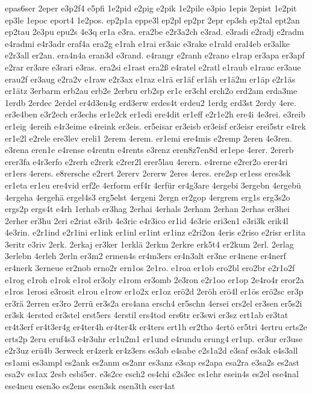 {epas6ser
2eper
e3p2f4
e5pfi
1e2pid
e2pig
e2pik
1e2pile
e3pio
1epis
2epist
1e2pit
ep3le
1epoc
eport4
1e2pos.
ep2p1a
eppe3l
ep2pl
ep2pr
2epr
ep3sh
ep2tal
ept2an
ep2tau
2e3pu
epu2s
4e3q
er1a
e3ra.
era2be
e2r3a2ch
e3rad.
e3radi
e2radj
e2radm
e4radmi
e4r3adr
eraf4a
era2g
e1rah
e1rai
er3aic
e3rake
e1rald
eral4eb
er3alke
e2r3all
er2an.
era4n4a
eran3d
e3rand.
e4rangr
e2ranh
e2rano
e1rap
er3apa
er3apf
e2rar
er3are
e3rari
e3ras.
era2si
e1rast
era2ß
e4ratel
e2ratl
e1raub
e1rauc
er3aue
erau2f
er3aug
e2ra2v
e1raw
e2r3ax
e1raz
e1rä
er1äf
er1äh
er1ä2m
er1äp
e2r1äs
er1ätz
3erbarm
erb2au
erb2e
2erbru
erb2sp
er1c
er3chl
erch2o
erd2am
erda3me
1erdb
2erdec
2erdel
er4d3en4g
erd3erw
erdes4t
erdeu2
1erdg
erd3st
2erdy
4ere.
er3e4ben
e3r2ech
er3echs
er1e2ck
er1edi
ere4dit
er1eff
e2r1e2h
ere4i
4e3rei.
e3reib
er1eig
4ereih
e4r3eime
e4reink
er3eis.
er5eisar
er3eisb
er3eisf
er3eisr
erei5str
e4rek
er1e2l
e2rele
ere3lev
ereli1
2erem
4erem.
er1emi
ere4mis
e2remp
2eren
4e3ren.
e3rena
eren1e
e4rense
e4rentn
e4rents
e3renz
eren8z7en8d
er1epe
4erer.
2ererb
erer3fa
e4r3erfo
e2rerh
e2rerk
e2rer2l
erer5lau
4erern.
e4rerne
e2rer2o
erer4ri
er1ers
4erers.
e8rersche
e2rert
2ererv
2ererw
2eres
4eres.
ere2sp
er1ess
eres3sk
er1eta
er1eu
ere4vid
erf2e
4erform
erf4r
4erfür
er4g3are
4ergebi
3ergebn
4ergebü
4ergeha
4ergehä
ergel4s3
erg5elst
4ergeni
2ergn
er2gop
4ergrem
erg1s
erg3s2o
ergs2p
ergs4t
e4rh
1erhab
er3hag
2erhai
4erhals
2erham
2erhan
2erhas
er3hei
2erher
er3hu
2eri
e2riat
e3rib
4e3ric
e4r3ico
er1id
4e3rie
eri3en1
e3ri3k
erik4l
4e3rin.
e2r1ind
e2r1ini
er1ink
er1inl
er1int
er1inz
e2ri2on
4eris
e2riso
e2risr
er1ita
3eritr
e3riv
2erk.
2erkaj
er3ker
1erklä
2erkm
2erkre
erk5t4
er2kum
2erl.
2erlag
3erlebn
4erleh
2erln
er3m2
ermen4s
er4m3ers
er4n3alt
er3ne
er4nene
er4nerf
er4nerk
3erneue
er2nob
erno2r
ern1os
2e1ro.
e1roa
er1ob
ero2bl
ero2br
e2r1o2f
e1rog
e1roh
e1rok
e1rol
er3oly
e1rom
er3omb
2e3ron
e2r1oo
er1op
2e4ro4r
eror2a
e1ros
1erosi
e3rosit
e1rou
e1row
er1o2x
er1oz
erö2d
2eröh
erö4l
er1ös
erö2sc
er3p
er3rä
2erren
er3ro
2errü
er3s2a
ers4ana
ersch4
er5schn
4ersei
ers2el
er3sen
er5s2i
er3sk
4ersted
er3stel
erst5ers
4erstil
ers4tod
ers6tr
er3swi
er3sz
ert1ab
er3tat
er4t3erf
er4t3er4g
er4ter4h
er4ter4k
er4ters
ert1h
er2tho
4ertö
er5tri
4ertru
erts2e
erts2p
2eru
eruf4s3
e4r3uhr
er1u2m1
er1und
e4rundu
erung4
er1up.
er3ur
er3use
e2r3uz
erü4b
3erweck
er4zerk
er4z3ers
es3ab
e4sabe
e2s1a2d
e3saf
es3ak
e4s3all
es1ami
es3ampl
es2ank
es2anm
es2anr
es3anz
e3sap
es2apa
esa2ra
e3sa2s
es2ast
esa2v
es1ax
2esb
esbi5er.
e3s2ce
esch2
es4chi
e2s3ec
es1ehr
esein4s
es2el
ese4nal
ese4neu
esen3o
es2ens
esen3sk
esen3th
eser4at
}

